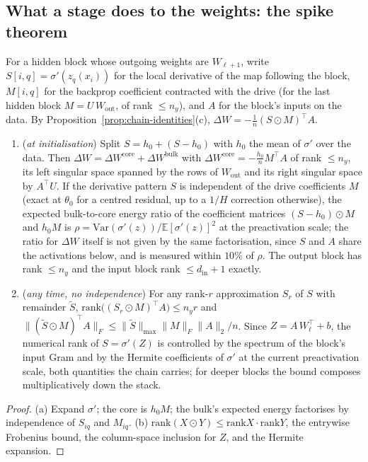 \subsection{What a stage does to the weights: the spike theorem}
\label{ssec:chain-spikes}

For a hidden block whose outgoing weights are $W_{\ell+1}$, write
$S[i,q]=\sigma'(z_q(x_i))$ for the local derivative of the map following the
block, $M[i,q]$ for the backprop coefficient contracted with the drive (for the
last hidden block $M=U\,W_{\mathrm{out}}$, of rank $\le n_y$), and $A$ for the
block's inputs on the data. By Proposition~\ref{prop:chain-identities}(c),
$\Delta W=-\frac1n(S\odot M)^{\!\top}A$.

\begin{theorem}
\label{thm:spike}
\begin{enumerate}
\item[(a)] (\emph{at initialisation}) Split $S=h_0+(S-h_0)$ with $h_0$ the mean of
$\sigma'$ over the data. Then $\Delta W=\Delta W^{\mathrm{core}}+\Delta W^{\mathrm{bulk}}$ with
$\Delta W^{\mathrm{core}}=-\frac{h_0}nM^{\!\top}A$ of rank $\le n_y$, its left
singular space spanned by the rows of $W_{\mathrm{out}}$ and its right singular
space by $A^{\!\top}U$. If the derivative pattern $S$ is independent of the
drive coefficients $M$ (exact at $\theta_0$ for a centred residual, up to a
$1/H$ correction otherwise), the expected bulk-to-core energy ratio of the
coefficient matrices $(S-h_0)\odot M$ and $h_0M$ is
$\rho=\mathrm{Var}(\sigma'(z))/\mathbb E[\sigma'(z)]^2$ at the preactivation scale;
the ratio for $\Delta W$ itself is not given by the same factorisation, since
$S$ and $A$ share the activations below, and is measured within $10\%$ of $\rho$.
The output block has rank $\le n_y$ and the input block rank $\le d_{\mathrm{in}}+1$ exactly.
\item[(b)] (\emph{any time, no independence}) For any rank-$r$ approximation
$S_r$ of $S$ with remainder $\tilde S$,
$\mathrm{rank}\big((S_r\odot M)^{\!\top}A\big)\le n_y r$ and
$\|(\tilde S\odot M)^{\!\top}A\|_F\le\|\tilde S\|_{\max}\|M\|_F\|A\|_2/n$. Since
$Z=A\,W_\ell^{\!\top}+b$, the numerical rank of $S=\sigma'(Z)$ is controlled by the
spectrum of the block's input Gram and by the Hermite coefficients of
$\sigma'$ at the current preactivation scale, both quantities the chain
carries; for deeper blocks the bound composes multiplicatively down the stack.
\end{enumerate}
\end{theorem}
\begin{proof}
(a) Expand $\sigma'$; the core is $h_0M$; the bulk's expected energy factorises
by independence of $S_{iq}$ and $M_{iq}$. (b) $\mathrm{rank}(X\odot Y)\le
\mathrm{rank}X\cdot\mathrm{rank}Y$, the entrywise Frobenius bound, the
column-space inclusion for $Z$, and the Hermite expansion.
\end{proof}


